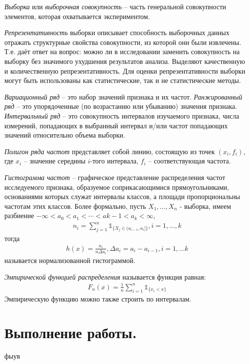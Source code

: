 \textit{Выборка} или \textit{выборочная совокупность} -- часть генеральной совокупности элементов, которая охватывается экспериментом.

\textit{Репрезентативность} выборки описывает способность выборочных данных отражать структурные свойства совокупности, из которой они были извлечены. Т.е. даёт ответ на вопрос: можно ли в исследовании заменить совокупность на выборку без значимого ухудшения результатов анализа.
Выделяют качественную и количественную репрезентативность.
Для оценки репрезентативности выборки могут быть использованы как статистические,
так и не статистические методы.

\textit{Вариационный ряд} -- это набор значений признака и их частот.
\textit{Ранжированный ряд} -- это упорядоченные (по возрастанию или убыванию) значения признака.
\textit{Интервальный ряд} -- это совокупность интервалов изучаемого признака, числа измерений, попадающих в выбранный интервал и/или
частот попадающих значений относительно объема выборки.

\textit{Полигон ряда частот} представляет собой линию, состоящую из точек $(x_i, f_i)$,
где $x_i$ -- значение середины $i$-того интервала, $f_i$ -- соответствующая частота.

\textit{Гистограмма частот} -- графическое представление распределения частот исследуемого
признака, образуемое соприкасающимися прямоугольниками, основаниями которых служат интервалы классов, а площади пропорциональны частотам этих классов.
Более формально, пусть $X_1, \dots, X_n$ - выборка, имеем разбиение $-\infty < a_0 < a_1 < \cdots < a{k-1} < a_k < \infty$,
\begin{gather*}
    n_i = \sum_{j=1}^n \mathds{1}_{\{X_j \in (a_{i-1}, a_i]\}}, i = 1, \dots, k
\end{gather*}
тогда
\begin{gather*}
    h(x) = \frac{n_i}{n\Delta a_i}, \Delta a_i = a_i - a_{i-1}, i = 1, \dots k
\end{gather*}
называется нормализованной гистограммой.

\textit{Эмпирической функцией распределения} называется функция равная:
\begin{gather*}
    F_n(x) = \frac{1}{n} \sum_{i=1}^n \mathds{1}_{\{x_i < x\}}
\end{gather*}
Эмпирическую функцию можно также строить по интервалам.

\section*{Выполнение работы.}
фыув